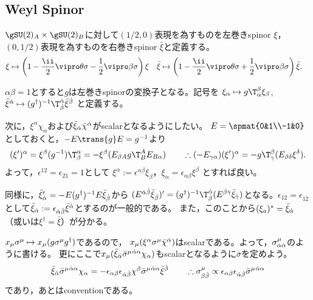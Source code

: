 \subsection{Weyl Spinor}\label{sec:weyl-spinor}
$\gSU(2)_A\times\gSU(2)_B$に対して$(1/2,0)$表現を為すものを左巻きspinor $\xi$，$(0,1/2)$表現を為すものを右巻きspinor $\bar\xi$と定義する。
\begin{align}
 \xi&\mapsto\left(1-\frac\ii2\vipro\theta\sigma-\frac12\vipro\beta\sigma\right)\xi&
 \bar\xi&\mapsto\left(1-\frac\ii2\vipro\theta\sigma+\frac12\vipro\beta\sigma\right)\bar\xi.
\end{align}

$\alpha\beta=1$とすると$g$は左巻きspinorの変換子となる。記号を
$\xi_\alpha\mapsto g\T_\alpha^\beta\xi_\beta$,
$\bar\xi^\dalpha\mapsto (g^\dagger)^{-1}\T^\dalpha_\dbeta\bar\xi^\dbeta$
と定義する。

次に，$\xi^\alpha\chi_\alpha$および$\bar\xi_{\dot\alpha}\bar\chi^{\dot\alpha}$がscalarとなるようにしたい。
$E=\spmat{0&1\\-1&0}$としておくと，$-E\trans{g}E=g^{-1}$より
\begin{equation}
 (\xi')^\alpha=\xi^\beta(g^{-1})\T_\beta^\alpha
              =-\xi^\beta(E_{\beta A}g\T_B^AE_{B\alpha})\qquad\therefore (-E_{\gamma\alpha})(\xi')^\alpha = -g\T_\gamma^\beta(E_{\beta\delta}\xi^\delta).
\end{equation}
よって，$\epsilon^{12}=\epsilon_{21}=1$として
$\xi^\alpha:=\epsilon^{\alpha\beta}\xi_\beta$，$\xi_\alpha=\epsilon_{\alpha\beta}\xi^\beta$
とすれば良い。


同様に，$\bar\xi'_{\dot\alpha}=-E(g^\dagger)^{-1}E\bar\xi_{\dot\beta}$から
$(E^{\dalpha\dbeta}\bar\xi_\dbeta)'=(g^\dagger)^{-1}{}\T^\dalpha_\dbeta (E^{\dbeta\dgamma}\bar\xi_\dgamma)$となる。$\epsilon_{12}=\epsilon_{\dot1\dot2}$として$\bar\xi_{\dot\alpha}:=\epsilon_{{\dot\alpha}{\dot\beta}}\bar\xi^{\dot\alpha}$とするのが一般的である。
また，このことから$(\xi_a)^*=\bar\xi_{\dot\alpha}$（或いは$\xi^\dagger=\bar\xi$）が分かる。

$x_\mu\sigma^\mu\mapsto x_\mu(g\sigma^\mu g^\dagger)$であるので，
$x_\mu(\xi^\alpha \sigma^\mu \bar\chi^{\dot\alpha})$はscalarである。よって，$\sigma^\mu_{\alpha{\dot\alpha}}$のように書ける。
更にここで$x_\mu(\bar\xi_{\dot\alpha}\bar\sigma^\mu{}^{{\dot\alpha}\alpha}\chi_\alpha)$もscalarとなるように$\bar\sigma$を定めよう。
\begin{equation}
 \bar\xi_{\dot\alpha}\bar\sigma^\mu{}^{{\dot\alpha}\alpha}\chi_\alpha=-\epsilon_{\alpha\beta}\epsilon_{{\dot\alpha}{\dot\beta}}\chi^\beta\bar\sigma^\mu{}^{{\dot\alpha}\alpha}\bar\xi^{\dot\beta}
\qquad\therefore \sigma^\mu_{\beta{\dot\beta}}\propto \epsilon_{\alpha\beta}\epsilon_{{\dot\alpha}{\dot\beta}}\bar\sigma^\mu{}^{{\dot\alpha}\alpha}
\end{equation}
であり，あとはconventionである。

